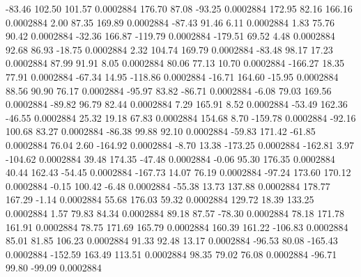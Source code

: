       -83.46      102.50      101.57     0.0002884
      176.70       87.08      -93.25     0.0002884
      172.95       82.16      166.16     0.0002884
        2.00       87.35      169.89     0.0002884
      -87.43       91.46        6.11     0.0002884
        1.83       75.76       90.42     0.0002884
      -32.36      166.87     -119.79     0.0002884
     -179.51       69.52        4.48     0.0002884
       92.68       86.93      -18.75     0.0002884
        2.32      104.74      169.79     0.0002884
      -83.48       98.17       17.23     0.0002884
       87.99       91.91        8.05     0.0002884
       80.06       77.13       10.70     0.0002884
     -166.27       18.35       77.91     0.0002884
      -67.34       14.95     -118.86     0.0002884
      -16.71      164.60      -15.95     0.0002884
       88.56       90.90       76.17     0.0002884
      -95.97       83.82      -86.71     0.0002884
       -6.08       79.03      169.56     0.0002884
      -89.82       96.79       82.44     0.0002884
        7.29      165.91        8.52     0.0002884
      -53.49      162.36      -46.55     0.0002884
       25.32       19.18       67.83     0.0002884
      154.68        8.70     -159.78     0.0002884
      -92.16      100.68       83.27     0.0002884
      -86.38       99.88       92.10     0.0002884
      -59.83      171.42      -61.85     0.0002884
       76.04        2.60     -164.92     0.0002884
       -8.70       13.38     -173.25     0.0002884
     -162.81        3.97     -104.62     0.0002884
       39.48      174.35      -47.48     0.0002884
       -0.06       95.30      176.35     0.0002884
       40.44      162.43      -54.45     0.0002884
     -167.73       14.07       76.19     0.0002884
      -97.24      173.60      170.12     0.0002884
       -0.15      100.42       -6.48     0.0002884
      -55.38       13.73      137.88     0.0002884
      178.77      167.29       -1.14     0.0002884
       55.68      176.03       59.32     0.0002884
      129.72       18.39      133.25     0.0002884
        1.57       79.83       84.34     0.0002884
       89.18       87.57      -78.30     0.0002884
       78.18      171.78      161.91     0.0002884
       78.75      171.69      165.79     0.0002884
      160.39      161.22     -106.83     0.0002884
       85.01       81.85      106.23     0.0002884
       91.33       92.48       13.17     0.0002884
      -96.53       80.08     -165.43     0.0002884
     -152.59      163.49      113.51     0.0002884
       98.35       79.02       76.08     0.0002884
      -96.71       99.80      -99.09     0.0002884
